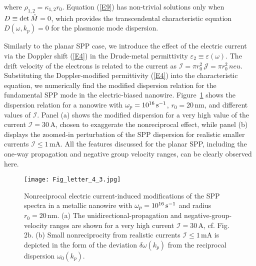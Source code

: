 \documentclass[9pt,twocolumn,twoside]{osajnl}
\begin{document}
%
where ${\rho _{1,2}} = {\kappa _{1,2}}{r_0}$. Equation (\ref{E9}) has non-trivial solutions only when $D \equiv {\rm det}\, \hat M = 0$, which provides the transcendental characteristic equation $D\! \left( {\omega ,{k_p}} \right) = 0$ for the plasmonic mode dispersion. 

Similarly to the planar SPP case, we introduce the effect of the electric current via the Doppler shift (\ref{E4}) in the Drude-metal permittivity ${\varepsilon _2} \equiv \varepsilon \left( \omega  \right)$. The drift velocity of the electrons is related to the current as ${\mathcal I} = \pi r_0^2\,{\mathcal J} = \pi r_0^2\,neu$. Substituting the Doppler-modified permittivity (\ref{E4}) into the characteristic equation, we numerically find the modified dispersion relation for the fundamental SPP mode in the electric-biased nanowire. Figure~\ref{F4} shows the dispersion relation for a nanowire with ${\omega _p} = {10^{16}}\,{\rm s}^{-1}$, ${r_0} = 20\,$nm, and different values of ${\mathcal I}$. Panel (a) shows the modified dispersion for a very high value of the current ${\mathcal I}=30\,$A, chosen to exaggerate the nonreciprocal effect, while panel (b) displays the zoomed-in perturbation of the SPP dispersion for realistic smaller currents ${\mathcal I} \leq 1\,$mA. All the features discussed for the planar SPP, including the one-way propagation and negative group velocity ranges, can be clearly observed here. 

\begin{figure}[t]
\centering
\texttt{[image: Fig\_letter\_4\_3.jpg]}
\caption{Nonreciprocal electric current-induced modifications of the SPP spectra in a metallic nanowire with ${\omega _p} = {10^{16}}\,{\rm s}^{-1}$ and radius ${r_0} = 20\,$nm. (a) The unidirectional-propagation and negative-group-velocity ranges are shown for a very high current ${\mathcal I}=30\,$A, cf. Fig. 2b. (b) Small nonreciprocity from realistic currents ${\mathcal I} \leq 1\,$mA is depicted in the form of the deviation $\delta \omega\! \left( {{k_p}} \right)$ from the reciprocal dispersion $\omega_0\! \left( {{k_p}} \right)$.}
\label{F4}
\end{figure}
\end{document}
